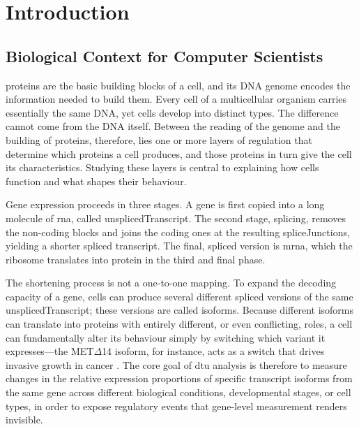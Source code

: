 \chapter{Introduction}

\section{Biological Context for Computer Scientists}
\Glspl{protein} are the basic building blocks of a cell, and its DNA \gls{genome} encodes the information needed to build them. Every cell of a multicellular organism carries essentially the same DNA, yet cells develop into distinct types. The difference cannot come from the DNA itself. Between the reading of the genome and the building of proteins, therefore, lies one or more layers of regulation that determine which proteins a cell produces, and those proteins in turn give the cell its characteristics. Studying these layers is central to explaining how cells function and what shapes their behaviour.

Gene expression proceeds in three stages. A \gls{gene} is first copied into a long molecule of \gls{rna}, called \gls{unsplicedTranscript}. The second stage, \gls{splicing}, removes the non-coding blocks and joins the coding ones at the resulting \glspl{spliceJunction}, yielding a shorter spliced \gls{transcript}. The final, spliced version is \gls{mrna}, which the ribosome translates into protein in the third and final phase.

The shortening process is not a one-to-one mapping. To expand the decoding capacity of a gene, cells can produce several different spliced versions of the same \gls{unsplicedTranscript}; these versions are called \glspl{isoform}. Because different isoforms can translate into proteins with entirely different, or even conflicting, roles, a cell can fundamentally alter its behaviour simply by switching which variant it expresses---the MET$\Delta$14 isoform, for instance, acts as a switch that drives invasive growth in cancer \cite{cerqua2022met}. The core goal of \gls{dtu} analysis is therefore to measure changes in the relative expression proportions of specific transcript isoforms from the same gene across different biological conditions, developmental stages, or cell types, in order to expose regulatory events that gene-level measurement renders invisible.

